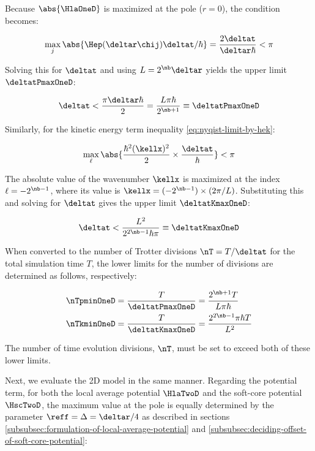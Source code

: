 \documentclass[manuscript_main.tex]{subfiles}
\begin{document}
Because $\abs{\HlaOneD}$ is maximized at the pole ($r=0$), the condition becomes:

\begin{equation}
\max_{j}\abs{\Hep(\deltar\chij)\deltat/\hbar} = \frac{2\deltat}{\deltar\hbar}<\pi
\end{equation}

Solving this for $\deltat$ and using $L=2^{\nb}\deltar$ yields the upper limit $\deltatPmaxOneD$:

\begin{equation}
\deltat < \frac{\pi\deltar\hbar}{2}=\frac{L\pi\hbar}{2^{\nb+1}}\equiv\deltatPmaxOneD
 \label{eq:nyqist-limit-by-hep-final}
\end{equation}

Similarly, for the kinetic energy term inequality \eqref{eq:nyqist-limit-by-hek}:

\begin{equation}
\max_{\ell}\abs{\frac{\hbar^2(\kellx)^2}{2}\times\frac{\deltat}{\hbar}} < \pi
\label{eq:nyqist-limit-by-hek-maximum}
\end{equation}

The absolute value of the wavenumber $\kellx$ is maximized at the index $\ell =
-2^{\nb-1}$, where its value is $\kellx = (-2^{\nb-1})\times(2\pi/L)$.
Substituting this and solving for $\deltat$ gives the upper limit
$\deltatKmaxOneD$:

\begin{equation}
\deltat < \frac{L^2}{2^{2\nb-1}\hbar\pi}\equiv\deltatKmaxOneD
 \label{eq:nyqist-limit-by-hek-final}
\end{equation}

When converted to the number of Trotter divisions $\nT = T/\deltat$ for the
total simulation time $T$, the lower limits for the number of divisions are
determined as follows, respectively:

\begin{align}
    \nTpminOneD &= \frac{T}{\deltatPmaxOneD}=\frac{2^{\nb+1}T}{L\pi\hbar}
    \label{eq:nT-pmin-definition}\\
    \nTkminOneD &= \frac{T}{\deltatKmaxOneD}=\frac{2^{2\nb-1}\pi\hbar T}{L^2}
    \label{eq:nT-kmin-definition}
\end{align}

The number of time evolution divisions, $\nT$, must be set to exceed both of these
lower limits.

Next, we evaluate the 2D model in the same manner. Regarding the potential term,
for both the local average potential $\HlaTwoD$ and the soft-core potential
$\HscTwoD$, the maximum value at the pole is equally determined by the parameter
$\reff=\Delta=\deltar/4$ as described in sections
\ref{subsubsec:formulation-of-local-average-potential} and
\ref{subsubsec:deciding-offset-of-soft-core-potential}:
\end{document}
